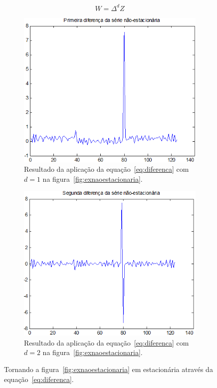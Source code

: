 \begin{equation}
W = \Delta^dZ
\label{eq:diferenca}
\end{equation}

\begin{figure}[ht]
\centering
\begin{subfigure}{.49\textwidth}
  \centering
  \includegraphics[width=1\linewidth]{fig/serieprimeiradiferenca.png}  
  \caption{Resultado da aplicação da equação~\ref{eq:diferenca} com $d=1$ na
  figura~\ref{fig:exnaoestacionaria}.}
  \label{fig:d1}
\end{subfigure}%
\hfill
\begin{subfigure}{.49\textwidth}
  \centering
  \includegraphics[width=1\linewidth]{fig/seriesegundadiferenca.png}
  \caption{Resultado da aplicação da equação~\ref{eq:diferenca} com $d=2$ na
  figura~\ref{fig:exnaoestacionaria}.}
  \label{fig:d2}
\end{subfigure}
  \caption{Tornando a figura~\ref{fig:exnaoestacionaria} em
  estacionária através da equação~\ref{eq:diferenca}.}
\label{fig:d1ed2}
\end{figure}


